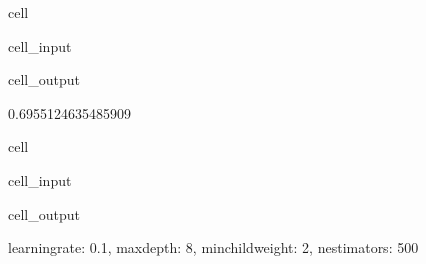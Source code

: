 \documentclass[letterpaper,10pt,english]{sphinxmanual}
\begin{document}
\begin{sphinxuseclass}{cell}
\begin{sphinxuseclass}{cell_input}
\begin{sphinxVerbatim}[commandchars=\\\{\}]
\end{sphinxVerbatim}

\end{sphinxuseclass}
\begin{sphinxuseclass}{cell_output}
\begin{sphinxVerbatim}[commandchars=\\\{\}]
0.6955124635485909
\end{sphinxVerbatim}

\end{sphinxuseclass}
\end{sphinxuseclass}
\begin{sphinxuseclass}{cell}
\begin{sphinxuseclass}{cell_input}
\begin{sphinxVerbatim}[commandchars=\\\{\}]
\end{sphinxVerbatim}

\end{sphinxuseclass}
\begin{sphinxuseclass}{cell_output}
\begin{sphinxVerbatim}[commandchars=\\\{\}]
\PYGZob{}\PYGZsq{}learning\PYGZus{}rate\PYGZsq{}: 0.1,
 \PYGZsq{}max\PYGZus{}depth\PYGZsq{}: 8,
 \PYGZsq{}min\PYGZus{}child\PYGZus{}weight\PYGZsq{}: 2,
 \PYGZsq{}n\PYGZus{}estimators\PYGZsq{}: 500\PYGZcb{}
\end{sphinxVerbatim}

\end{sphinxuseclass}
\end{sphinxuseclass}
\end{document}
